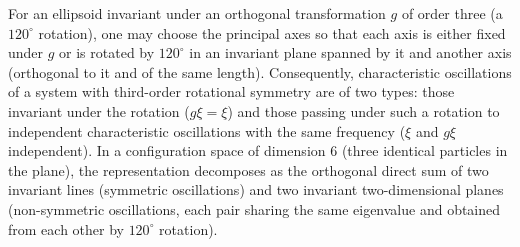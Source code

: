 For an ellipsoid invariant under an orthogonal transformation $g$ of order three (a $120^\circ$ rotation), one may choose the principal axes so that each axis is either fixed under $g$ or is rotated by $120^\circ$ in an invariant plane spanned by it and another axis (orthogonal to it and of the same length). Consequently, characteristic oscillations of a system with third-order rotational symmetry are of two types: those invariant under the rotation ($g\xi = \xi$) and those passing under such a rotation to independent characteristic oscillations with the same frequency ($\xi$ and $g\xi$ independent). In a configuration space of dimension $6$ (three identical particles in the plane), the representation decomposes as the orthogonal direct sum of two invariant lines (symmetric oscillations) and two invariant two-dimensional planes (non-symmetric oscillations, each pair sharing the same eigenvalue and obtained from each other by $120^\circ$ rotation).
